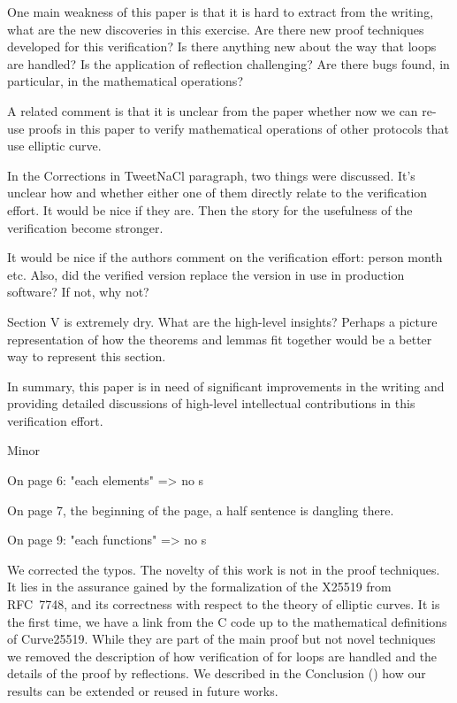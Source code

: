 One main weakness of this paper is that it is hard to extract from the writing,
what are the new discoveries in this exercise. Are there new proof techniques
developed for this verification? Is there anything new about the way that loops
are handled? Is the application of reflection challenging? Are there bugs found,
in particular, in the mathematical operations?

A related comment is that it is unclear from the paper whether now we can re-use
proofs in this paper to verify  mathematical operations of other protocols that
use elliptic curve.

In the Corrections in TweetNaCl paragraph, two things were discussed. It's
unclear how and whether either one of them directly relate to the verification
effort. It would be nice if they are. Then the story for the usefulness of the
verification become stronger.

It would be nice if the authors comment on the verification effort: person month
etc. Also, did the verified version replace the version in use in production
software? If not, why not?

Section V is extremely dry. What are the high-level insights? Perhaps a picture
representation of how the theorems and lemmas fit together would be a better way
to represent this section.

In summary, this paper is in need of significant improvements in the writing and
providing detailed discussions of high-level intellectual contributions in this
verification effort.

Minor

On page 6: "each elements" => no s

On page 7, the beginning of the page, a half sentence is
dangling there.

On page 9: "each functions" => no s


We corrected the typos.
The novelty of this work is not in the proof techniques.
It lies in the assurance gained by the formalization of the X25519 from RFC~7748,
and its correctness with respect to the theory of elliptic curves.
It is the first time, we have a link from the C code up to the mathematical
definitions of Curve25519.
While they are part of the main proof but not novel techniques we removed the
description of how verification of for loops are handled and the details of the
proof by reflections.
We described in the Conclusion () how our results can be
extended or reused in future works.


